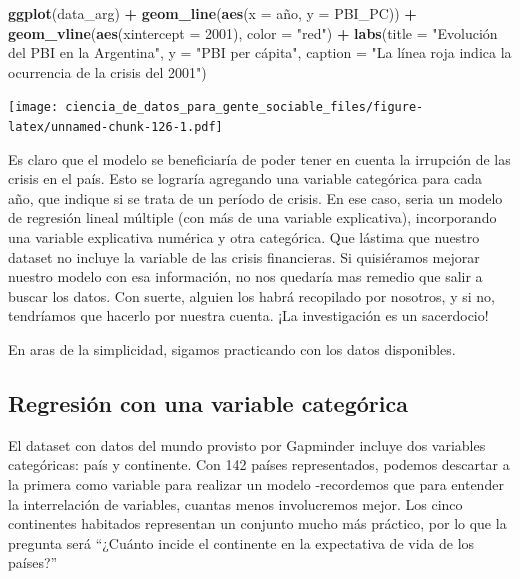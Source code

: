 \documentclass[]{book}
\newenvironment{Shaded}{\begin{snugshade}}{\end{snugshade}}
\newcommand{\KeywordTok}[1]{\textcolor[rgb]{0.13,0.29,0.53}{\textbf{#1}}}
\newcommand{\DataTypeTok}[1]{\textcolor[rgb]{0.13,0.29,0.53}{#1}}
\newcommand{\DecValTok}[1]{\textcolor[rgb]{0.00,0.00,0.81}{#1}}
\newcommand{\StringTok}[1]{\textcolor[rgb]{0.31,0.60,0.02}{#1}}
\newcommand{\OperatorTok}[1]{\textcolor[rgb]{0.81,0.36,0.00}{\textbf{#1}}}
\newcommand{\NormalTok}[1]{#1}
\begin{document}
\begin{Shaded}
\begin{Highlighting}[]
\KeywordTok{ggplot}\NormalTok{(data_arg) }\OperatorTok{+}\StringTok{ }
\StringTok{    }\KeywordTok{geom_line}\NormalTok{(}\KeywordTok{aes}\NormalTok{(}\DataTypeTok{x =}\NormalTok{ año, }\DataTypeTok{y =}\NormalTok{ PBI_PC)) }\OperatorTok{+}
\StringTok{    }\KeywordTok{geom_vline}\NormalTok{(}\KeywordTok{aes}\NormalTok{(}\DataTypeTok{xintercept =} \DecValTok{2001}\NormalTok{), }\DataTypeTok{color =} \StringTok{"red"}\NormalTok{) }\OperatorTok{+}
\StringTok{    }\KeywordTok{labs}\NormalTok{(}\DataTypeTok{title =} \StringTok{"Evolución del PBI en la Argentina"}\NormalTok{,}
         \DataTypeTok{y =} \StringTok{"PBI per cápita"}\NormalTok{,}
         \DataTypeTok{caption =} \StringTok{"La línea roja indica la ocurrencia de la crisis del 2001"}\NormalTok{)}
\end{Highlighting}
\end{Shaded}

\texttt{[image: ciencia\_de\_datos\_para\_gente\_sociable\_files/figure-latex/unnamed-chunk-126-1.pdf]}

Es claro que el modelo se beneficiaría de poder tener en cuenta la
irrupción de las crisis en el país. Esto se lograría agregando una
variable categórica para cada año, que indique si se trata de un período
de crisis. En ese caso, seria un modelo de regresión lineal múltiple
(con más de una variable explicativa), incorporando una variable
explicativa numérica y otra categórica. Que lástima que nuestro dataset
no incluye la variable de las crisis financieras. Si quisiéramos mejorar
nuestro modelo con esa información, no nos quedaría mas remedio que
salir a buscar los datos. Con suerte, alguien los habrá recopilado por
nosotros, y si no, tendríamos que hacerlo por nuestra cuenta. ¡La
investigación es un sacerdocio!

En aras de la simplicidad, sigamos practicando con los datos
disponibles.

\subsection{Regresión con una variable
categórica}\label{regresion-con-una-variable-categorica}

El dataset con datos del mundo provisto por Gapminder incluye dos
variables categóricas: país y continente. Con 142 países representados,
podemos descartar a la primera como variable para realizar un modelo
-recordemos que para entender la interrelación de variables, cuantas
menos involucremos mejor. Los cinco continentes habitados representan un
conjunto mucho más práctico, por lo que la pregunta será ``¿Cuánto
incide el continente en la expectativa de vida de los países?''
\end{document}
